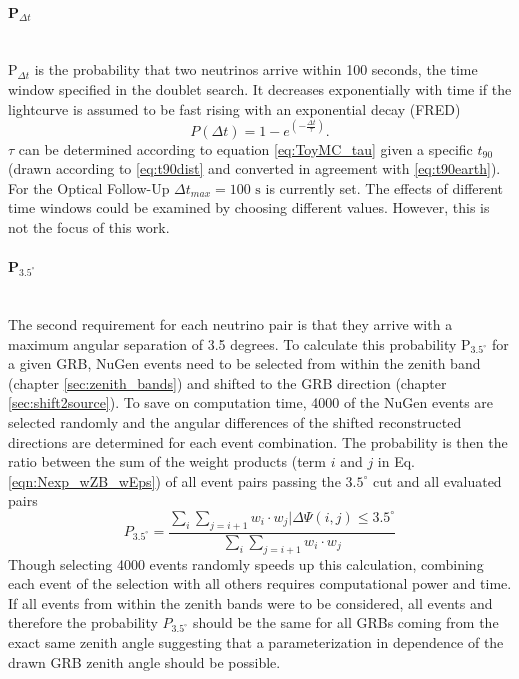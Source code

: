 \paragraph{P$_{\Delta t}$}$\;$\\
P$_{\Delta t}$ is the probability that two neutrinos arrive within
100 seconds, the time window
specified in the doublet search. 
It decreases exponentially with time if the lightcurve is assumed to be fast 
rising
with an exponential decay (FRED)
\begin{equation}
 P(\Delta t) = 1 - e^{\left(-\frac{\Delta t}{\tau} \right)}.
\end{equation}
$\tau$ can be determined according to equation \ref{eq:ToyMC_tau} given
a specific $t_{90}$ (drawn according to \ref{eq:t90dist} and converted in 
agreement
with \ref{eq:t90earth}). For the Optical Follow-Up
$\Delta t_{max} =100 \text{ s}$ is currently set. 
The effects of different time
windows could be examined by choosing different values. However, this is not
the focus of this work.



\paragraph{P$_{3.5^\circ}$}$\;$\\
The second requirement for each neutrino pair is that they arrive with a
maximum angular separation of 3.5 degrees. To calculate this probability 
P$_{3.5^\circ}$ for a given GRB, NuGen events need to be
selected from within the zenith band (chapter \ref{sec:zenith_bands}) and
shifted to the GRB direction (chapter \ref{sec:shift2source}). 
To save on computation time, 4000 of the NuGen events are selected randomly
and the angular 
differences of the
shifted reconstructed directions are determined for each event combination. The 
probability is then the
ratio between the sum of the weight products (term $i$ and $j$ in Eq. 
\ref{eqn:Nexp_wZB_wEps}) of
all event pairs passing the $3.5^\circ$ cut and all evaluated pairs
\begin{equation}
\label{eq:P3p5}
 P_{3.5^\circ} = \frac{\sum_{i} \sum_{j=i+1} w_i \cdot w_j | \Delta \Psi(i, j)
\leq
3.5^{\circ}}{\sum_i \sum_{j=i+1} w_i \cdot w_j}
\end{equation}
Though selecting 4000 events randomly speeds up this calculation, combining 
each event of the selection with all others requires computational power 
and time. 
If all events from within the zenith bands were to be considered, all events 
and therefore the probability $P_{3.5^\circ}$ should be the same for all GRBs 
coming from the exact same zenith angle suggesting that a parameterization in 
dependence of the drawn GRB zenith angle should be possible. 

